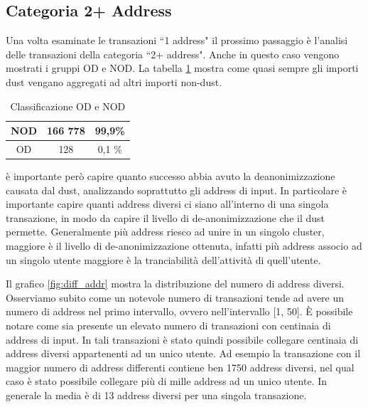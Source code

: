 \subsection{Categoria 2+ Address}
Una volta esaminate le transazioni ``1 address" il prossimo passaggio è l'analisi delle transazioni della categoria ``2+ address". Anche in questo caso vengono mostrati i gruppi OD e NOD. La tabella \ref{tab:OD_NOD_success} mostra come quasi sempre gli importi dust vengano aggregati ad altri importi non-dust.
\begin{table}[H]
    \centering
    \begin{tabular}{|c|c|c|}
        \hline
            NOD  & 166 778 & 99,9\%\\
        \hline 
            OD  & 128 & 0,1 \%\\
        \hline
    \end{tabular}
    \caption{Classificazione OD e NOD}
    \label{tab:OD_NOD_success}
\end{table}
è importante però capire quanto successo abbia avuto la deanonimizzazione causata dal dust, analizzando soprattutto gli address di input. In particolare è importante capire quanti address diversi ci siano all'interno di una singola transazione, in modo da capire il livello di de-anonimizzazione che il dust permette. Generalmente più address riesco ad unire in un singolo cluster, maggiore è il livello di de-anonimizzazione ottenuta, infatti più address associo ad un singolo utente maggiore è la tranciabilità dell'attività di quell'utente.

Il grafico \ref{fig:diff_addr} mostra la distribuzione del numero di address diversi. Osserviamo subito come un notevole numero di transazioni tende ad avere un numero di address nel primo intervallo, ovvero nell'intervallo [1, 50]. È possibile notare come sia presente un elevato numero di transazioni con centinaia di address di input. In tali transazioni è stato quindi possibile collegare centinaia di address diversi appartenenti ad un unico utente. Ad esempio la transazione con il maggior numero di address differenti contiene ben 1750 address diversi, nel qual caso è stato possibile collegare più di mille address ad un unico utente. In generale la media è di 13 address diversi per una singola transazione. 

